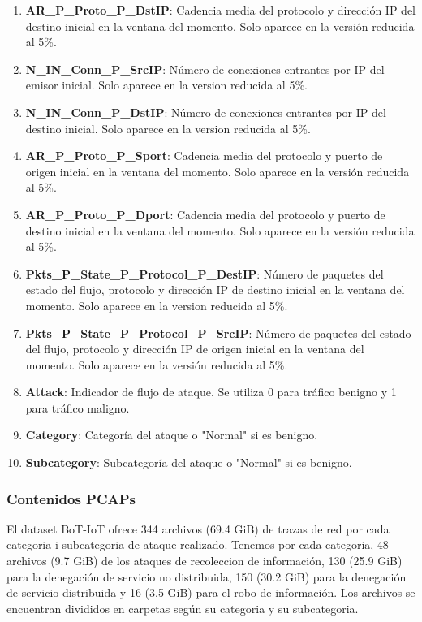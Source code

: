 \begin{enumerate}
    \item \textbf{AR\_P\_Proto\_P\_DstIP}: Cadencia media del protocolo y dirección IP del destino inicial en la ventana del momento. Solo aparece en la versión reducida al 5\%.
    \item \textbf{N\_IN\_Conn\_P\_SrcIP}: Número de conexiones entrantes por IP del emisor inicial. Solo aparece en la version reducida al 5\%.
    \item \textbf{N\_IN\_Conn\_P\_DstIP}: Número de conexiones entrantes por IP del destino inicial. Solo aparece en la version reducida al 5\%.
    \item \textbf{AR\_P\_Proto\_P\_Sport}: Cadencia media del protocolo y puerto  de origen inicial en la ventana del momento. Solo aparece en la versión reducida al 5\%.
    \item \textbf{AR\_P\_Proto\_P\_Dport}: Cadencia media del protocolo y puerto  de destino inicial en la ventana del momento. Solo aparece en la versión reducida al 5\%.
    \item \textbf{Pkts\_P\_State\_P\_Protocol\_P\_DestIP}: Número de paquetes del estado del flujo, protocolo y dirección IP de destino inicial en la ventana del momento. Solo aparece en la version reducida al 5\%.
    \item \textbf{Pkts\_P\_State\_P\_Protocol\_P\_SrcIP}: Número de paquetes del estado del flujo, protocolo y dirección IP de origen inicial en la ventana del momento. Solo aparece en la versión reducida al 5\%.
    \item \textbf{Attack}: Indicador de flujo de ataque. Se utiliza 0 para tráfico benigno y 1 para tráfico maligno.
    \item \textbf{Category}: Categoría del ataque o "Normal" si es benigno.
    \item \textbf{Subcategory}: Subcategoría del ataque o "Normal" si es benigno.
\end{enumerate}


\subsubsection{Contenidos PCAPs}

El dataset BoT-IoT ofrece 344 archivos (69.4 GiB) de trazas de red por cada categoria i subcategoria de ataque realizado. Tenemos por cada categoria, 48 archivos (9.7 GiB) de los ataques de recoleccion de información, 130 (25.9 GiB) para la denegación de servicio no distribuida, 150 (30.2 GiB) para la denegación de servicio distribuida y 16 (3.5 GiB) para el robo de información. Los archivos se encuentran divididos en carpetas según su categoria y su subcategoria.

